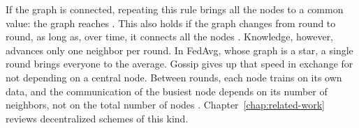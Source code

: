 If the graph is connected, repeating this rule brings all the nodes to a common value: the graph reaches
. This also holds if the graph changes from round to round, as long as, over time, it
connects all the nodes \cite{olfatisaber+07consensus,boyd+06gossip}. Knowledge, however, advances only one
neighbor per round. In \ac{FedAvg}, whose graph is a star, a single round brings everyone to the average. Gossip gives up that speed in exchange for not depending on a
central node. Between rounds, each node trains on its own data, and the communication of the busiest node
depends on its number of neighbors, not on the total number of nodes \cite{lian+17dpsgd}.
Chapter~\ref{chap:related-work} reviews decentralized schemes of this kind.
